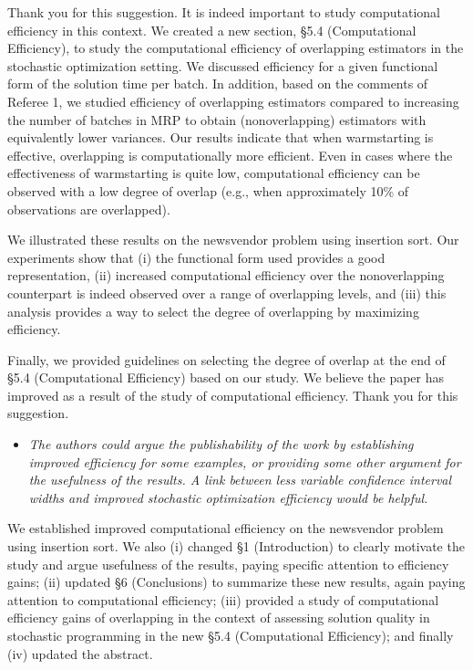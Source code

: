 \documentclass[11pt,notitlepage,onecolumn]{article}
\newcommand{\noi}{\noindent}
\begin{document}
\noi 
Thank you for this suggestion. 
It is indeed important to study computational efficiency in this context. 
We created a new section, \S 5.4 (Computational Efficiency), to study the computational efficiency of overlapping estimators in the stochastic optimization setting. 
We discussed efficiency for a given functional form of the solution time per batch. 
In addition, based on the comments of Referee 1, we studied efficiency of overlapping estimators compared to increasing the number of batches in MRP to obtain (nonoverlapping) estimators with equivalently lower variances. 
Our results indicate that when warmstarting is effective, overlapping is computationally more efficient.
Even in cases where the effectiveness of warmstarting is quite low, computational efficiency can be observed with a low degree of overlap (e.g., when approximately 10\% of observations are overlapped).\bigskip 

\noi 
We illustrated these results on the newsvendor problem using insertion sort. 
Our experiments show that (i) the functional form used provides a good representation, (ii) increased computational efficiency over the nonoverlapping counterpart is indeed observed over a range of overlapping levels, and (iii) this analysis provides a way to select the degree of overlapping by maximizing efficiency.\bigskip 
 
\noi
Finally, we provided guidelines on selecting the degree of overlap at the end of \S 5.4 (Computational Efficiency) based on our study. 
We believe the paper has improved as a result of the study of computational efficiency. 
Thank you for this suggestion. 
\medskip 


\begin{itemize}
\item[] \textit{The authors could argue the publishability of the work by establishing improved efficiency for some examples, or providing some other argument for the usefulness of the results.  
A link between less variable confidence interval widths and improved stochastic optimization efficiency would be helpful.}
\end{itemize}

\noi 
We established improved computational efficiency on the newsvendor problem using insertion sort.
We also (i) changed \S 1 (Introduction) to clearly motivate the study and argue usefulness of the results, paying specific attention to efficiency gains; (ii) updated \S 6 (Conclusions) to summarize these new results, again paying attention to computational efficiency; (iii) provided a study of computational efficiency gains of overlapping in the context of assessing solution quality in stochastic programming in the new \S 5.4 (Computational Efficiency); and finally (iv) updated the abstract.  
\medskip
\end{document}

